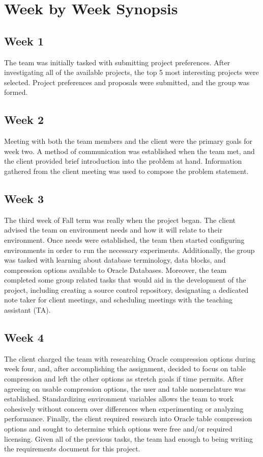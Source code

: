 \documentclass[10pt]{article}
\begin{document}
\section{Week by Week Synopsis}
\subsection{Week 1}
The team was initially tasked with submitting project preferences. After investigating all of the available projects, the top 5 most interesting projects were selected. Project preferences and proposals were submitted, and the group was formed.

\subsection{Week 2}
Meeting with both the team members and the client were the primary goals for week two. A method of communication was established when the team met, and the client provided brief introduction into the problem at hand. Information gathered from the client meeting was used to compose the problem statement.

\subsection{Week 3}
The third week of Fall term was really when the project began. The client advised the team on environment needs and how it will relate to their environment. Once needs were established, the team then started configuring environments in order to run the necessary experiments. Additionally, the group was tasked with learning about database terminology, data blocks, and compression options available to Oracle Databases. Moreover, the team completed some group related tasks that would aid in the development of the project, including creating a source control repository, designating a dedicated note taker for client meetings, and scheduling meetings with the teaching assistant (TA).

\subsection{Week 4}
The client charged the team with researching Oracle compression options during week four, and, after accomplishing the assignment, decided to focus on table compression and left the other options as stretch goals if time permits. After agreeing on usable compression options, the user and table nomenclature was established. Standardizing environment variables allows the team to work cohesively without concern over differences when experimenting or analyzing performance. Finally, the client required research into Oracle table compression options and sought to determine which options were free and/or required licensing. Given all of the previous tasks, the team had enough to being writing the requirements document for this project.
\end{document}
